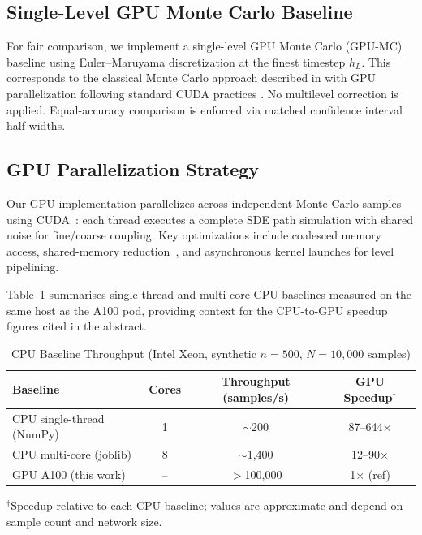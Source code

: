 \documentclass[pdflatex,sn-mathphys-num]{sn-jnl}
\theoremstyle{thmstyleone}%
\theoremstyle{thmstyletwo}%
\theoremstyle{thmstylethree}%
\begin{document}
\subsection{Single-Level GPU Monte Carlo Baseline}

For fair comparison, we implement a single-level GPU Monte Carlo (GPU-MC) baseline using
Euler--Maruyama discretization at the finest timestep $h_L$. This corresponds to the classical
Monte Carlo approach described in \cite{glasserman2003monte} with GPU parallelization following
standard CUDA practices \cite{nvidia2020cuda,owens2008,harris2007}. No multilevel correction
is applied. Equal-accuracy comparison is enforced via matched confidence interval half-widths.

\subsection{GPU Parallelization Strategy}

Our GPU implementation parallelizes across independent Monte Carlo samples using CUDA~\cite{nvidia2020cuda}: each thread executes a complete SDE path simulation with shared noise for fine/coarse coupling. Key optimizations include coalesced memory access, shared-memory reduction~\cite{harris2007}, and asynchronous kernel launches for level pipelining.

Table~\ref{tab:cpu_baselines} summarises single-thread and multi-core CPU baselines measured on
the same host as the A100 pod, providing context for the CPU-to-GPU speedup figures cited in the
abstract.

\begin{table}[!t]
\caption{CPU Baseline Throughput (Intel Xeon, synthetic $n{=}500$,
         $N{=}10{,}000$ samples)}
\label{tab:cpu_baselines}
\centering
\begin{tabular}{@{}l c c c@{}}
\toprule
Baseline & Cores & Throughput (samples/s) & GPU Speedup$^\dagger$ \\
\midrule
CPU single-thread (NumPy) & 1  & $\sim$200   & 87--644$\times$ \\
CPU multi-core (joblib)   & 8  & $\sim$1{,}400 & 12--90$\times$  \\
GPU A100 (this work)      & -- & $>$100{,}000 & 1$\times$ (ref) \\
\bottomrule
\end{tabular}
\vspace{2pt}
\footnotesize
$^\dagger$Speedup relative to each CPU baseline; values are
approximate and depend on sample count and network size.
\end{table}
\end{document}
